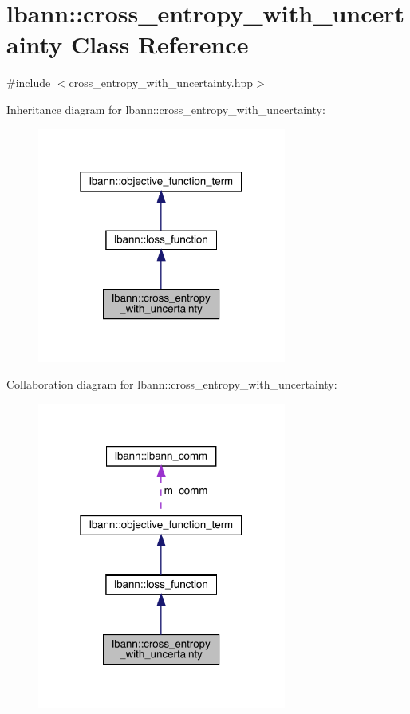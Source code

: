 \hypertarget{classlbann_1_1cross__entropy__with__uncertainty}{}\section{lbann\+:\+:cross\+\_\+entropy\+\_\+with\+\_\+uncertainty Class Reference}
\label{classlbann_1_1cross__entropy__with__uncertainty}


{\ttfamily \#include $<$cross\+\_\+entropy\+\_\+with\+\_\+uncertainty.\+hpp$>$}



Inheritance diagram for lbann\+:\+:cross\+\_\+entropy\+\_\+with\+\_\+uncertainty\+:\nopagebreak
\begin{figure}[H]
\begin{center}
\leavevmode
\includegraphics[width=232pt]{classlbann_1_1cross__entropy__with__uncertainty__inherit__graph}
\end{center}
\end{figure}


Collaboration diagram for lbann\+:\+:cross\+\_\+entropy\+\_\+with\+\_\+uncertainty\+:\nopagebreak
\begin{figure}[H]
\begin{center}
\leavevmode
\includegraphics[width=232pt]{classlbann_1_1cross__entropy__with__uncertainty__coll__graph}
\end{center}
\end{figure}
